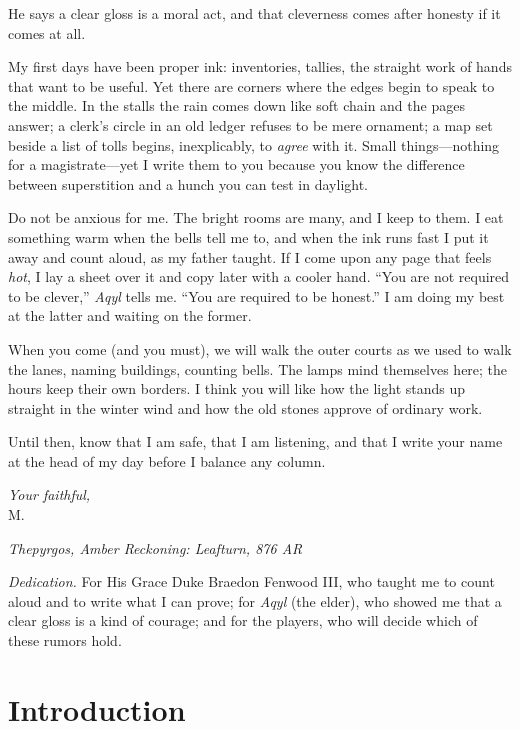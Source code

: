 \documentclass[11pt]{article}
\begin{document}
He says a clear gloss is a moral act, and that cleverness comes after honesty if it comes at all.

\medskip
My first days have been proper ink: inventories, tallies, the straight work of hands that want to be useful. Yet there are corners where the edges begin to speak to the middle. In the stalls the rain comes down like soft chain and the pages answer; a clerk’s circle in an old ledger refuses to be mere ornament; a map set beside a list of tolls begins, inexplicably, to \emph{agree} with it. Small things—nothing for a magistrate—yet I write them to you because you know the difference between superstition and a hunch you can test in daylight.

Do not be anxious for me. The bright rooms are many, and I keep to them. I eat something warm when the bells tell me to, and when the ink runs fast I put it away and count aloud, as my father taught. If I come upon any page that feels \emph{hot}, I lay a sheet over it and copy later with a cooler hand. “You are not required to be clever,” \textit{Aqyl} tells me. “You are required to be honest.” I am doing my best at the latter and waiting on the former.

\medskip
When you come (and you must), we will walk the outer courts as we used to walk the lanes, naming buildings, counting bells. The lamps mind themselves here; the hours keep their own borders. I think you will like how the light stands up straight in the winter wind and how the old stones approve of ordinary work.

Until then, know that I am safe, that I am listening, and that I write your name at the head of my day before I balance any column.

\medskip
\noindent\textit{Your faithful,}\\
M.

\begin{flushright}
\textit{Thepyrgos, Amber Reckoning: Leafturn, 876 AR}
\end{flushright}

\medskip
\noindent\textit{Dedication.} For His Grace Duke Braedon Fenwood III, who taught me to count aloud and to write what I can prove; for \textit{Aqyl} (the elder), who showed me that a clear gloss is a kind of courage; and for the players, who will decide which of these rumors hold.

\clearpage

\section{Introduction}
\label{sec:introduction}
\end{document}
